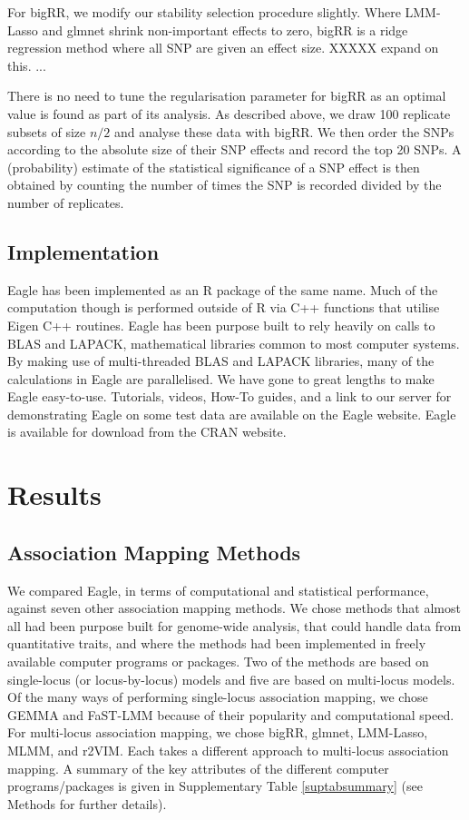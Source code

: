 \documentclass{article}
\begin{document}
 
For bigRR, we modify our stability selection procedure slightly.  Where LMM-Lasso and glmnet shrink non-important effects to zero, 
bigRR is a ridge regression method where all SNP are given an effect size.  XXXXX expand on this. ... 



There is no need to tune the regularisation parameter for bigRR as an optimal value is found as part of its analysis. 
As described above, we draw 100 replicate subsets of size $n/2$ and analyse these data with bigRR. We then order the 
SNPs according to the absolute size of their SNP effects and record the top 20 SNPs. 
A (probability)  estimate of the statistical significance of a SNP effect is then obtained by counting the 
number of times the SNP is recorded divided by the number of replicates. 





\subsection{Implementation}

Eagle has been implemented as an R package of the same name. Much of the computation though is performed outside of R 
via C++ functions that utilise Eigen C++ routines. Eagle has been purpose built to rely heavily on calls to BLAS and LAPACK, 
mathematical libraries common to most computer systems. By making use of multi-threaded  BLAS and LAPACK libraries, many of the 
calculations in Eagle are parallelised. We have gone to great lengths to make Eagle easy-to-use. Tutorials, videos, How-To guides, and 
a link to our server for demonstrating Eagle on some test data are available on the Eagle website. Eagle is available for download from the CRAN website. 

  
  

\section{Results}

\subsection{Association Mapping Methods}

We compared Eagle, in terms of computational and statistical performance, against seven other association mapping methods. 
We chose methods that almost all had been purpose built for genome-wide analysis, that could handle data from quantitative traits, and where the methods had been implemented in freely available computer programs or packages. Two of the methods are based on single-locus (or locus-by-locus) models and five are based on multi-locus models. Of the many ways of performing single-locus association mapping, we chose 
GEMMA and FaST-LMM  because of their popularity and computational speed. 
For multi-locus association mapping, we chose bigRR, glmnet, 
LMM-Lasso, MLMM, and r2VIM.  
Each takes a different approach to multi-locus association mapping. A summary of the key attributes of the different computer programs/packages 
is given in Supplementary Table \ref{suptabsummary} (see Methods for further details). 
\end{document}
